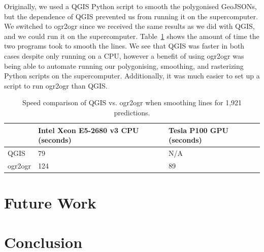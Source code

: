 \documentclass[acmtog, authorversion]{acmart}
\begin{document}
Originally, we used a QGIS Python script to smooth the polygonised GeoJSONs, but the dependence of QGIS prevented us from running it on the supercomputer. We switched to ogr2ogr since we received the same results as we did with QGIS, and we could run it on the supercomputer. Table~\ref{tab:time} shows the amount of time the two programs took to smooth the lines. We see that QGIS was faster in both cases despite only running on a CPU, however a benefit of using ogr2ogr was being able to automate running our polygonising, smoothing, and rasterizing Python scripts on the supercomputer. Additionally, it was much easier to set up a script to run ogr2ogr than QGIS.

\begin{table}
    \caption{Speed comparison of QGIS vs. ogr2ogr when smoothing lines for 1,921 predictions.}
    \label{tab:time}
    \begin{tabular}{l| p{3.2cm}| p{3.2cm}}
        \toprule
         & Intel Xeon E5-2680 v3 CPU (seconds) & Tesla P100 GPU (seconds)\\
        \midrule
        QGIS & 79 & N/A\\
        ogr2ogr & 124 & 89\\
        \bottomrule
    \end{tabular}
\end{table}

\section{Future Work}

\section{Conclusion}




\end{document}
